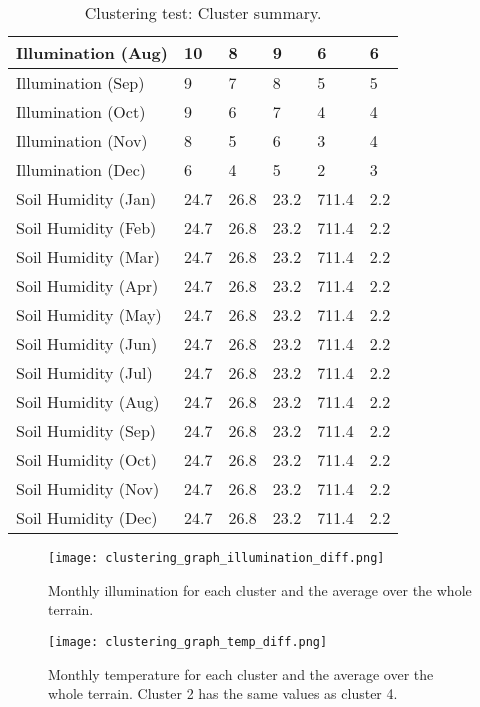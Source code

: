 \begin{table}[]
\begin{tabular}{|p{5cm}|p{2cm}|p{2cm}|p{2cm}|p{2cm}|p{2cm}|}
		\hline
		Illumination (Aug) & 10 & 8 & 9 & 6 & 6 \\
		\hline
		Illumination (Sep) & 9 & 7 & 8 & 5 & 5 \\
		\hline
		Illumination (Oct) & 9 & 6 & 7 & 4 & 4 \\
		\hline
		Illumination (Nov) & 8 & 5 & 6 & 3 & 4 \\
		\hline
		Illumination (Dec) & 6 & 4 & 5 & 2 & 3 \\
		\hline
  	    Soil Humidity (Jan) & 24.7 & 26.8 & 23.2 & 711.4 & 2.2 \\
		\hline
  	    Soil Humidity (Feb) & 24.7 & 26.8 & 23.2 & 711.4 & 2.2 \\
		\hline
  	    Soil Humidity (Mar) & 24.7 & 26.8 & 23.2 & 711.4 & 2.2 \\
		\hline
  	    Soil Humidity (Apr) & 24.7 & 26.8 & 23.2 & 711.4 & 2.2 \\
		\hline
  	    Soil Humidity (May) & 24.7 & 26.8 & 23.2 & 711.4 & 2.2 \\
		\hline
  	    Soil Humidity (Jun) & 24.7 & 26.8 & 23.2 & 711.4 & 2.2 \\
		\hline
  	    Soil Humidity (Jul) & 24.7 & 26.8 & 23.2 & 711.4 & 2.2 \\
		\hline
  	    Soil Humidity (Aug) & 24.7 & 26.8 & 23.2 & 711.4 & 2.2 \\
		\hline
  	    Soil Humidity (Sep) & 24.7 & 26.8 & 23.2 & 711.4 & 2.2 \\
		\hline
  	    Soil Humidity (Oct) & 24.7 & 26.8 & 23.2 & 711.4 & 2.2 \\
		\hline
  	    Soil Humidity (Nov) & 24.7 & 26.8 & 23.2 & 711.4 & 2.2 \\
		\hline
  	    Soil Humidity (Dec) & 24.7 & 26.8 & 23.2 & 711.4 & 2.2 \\
		\hline
		\end{tabular}
		\caption{Clustering test: Cluster summary.}
	  \label{tab:clustering_test_resulting_clusters}
\end{table}

\begin{figure}
\center
	\texttt{[image: clustering\_graph\_illumination\_diff.png]}
	\caption{ Monthly illumination for each cluster and the average over the whole terrain.}	
	\label{fig:clustering_graph_illumination}
\end{figure}

\begin{figure}
\center
	\texttt{[image: clustering\_graph\_temp\_diff.png]}
	\caption{ Monthly temperature for each cluster and the average over the whole terrain. Cluster 2 has the same values as cluster 4.}	
	\label{fig:clustering_graph_temp}
\end{figure}

